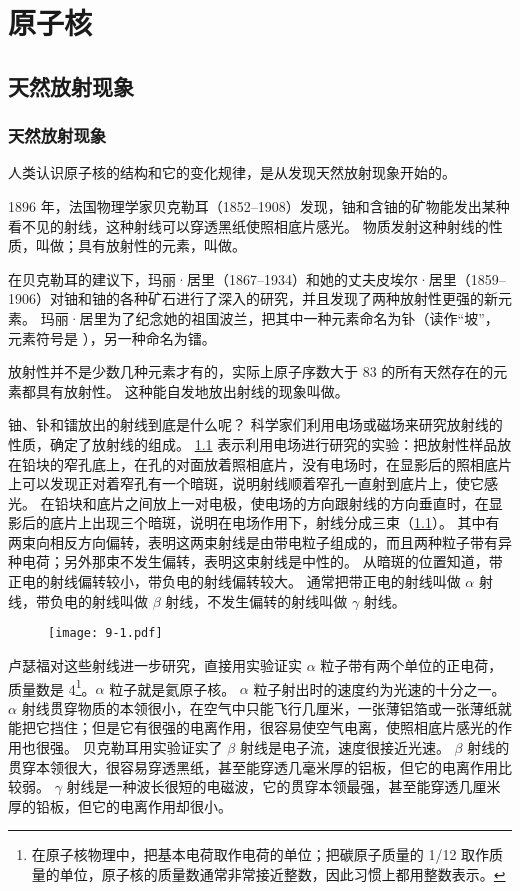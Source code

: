 \chapter{原子核}\label{chp:atomic_nucleus}
\section{天然放射现象}
\subsection{天然放射现象}
人类认识原子核的结构和它的变化规律，是从发现天然放射现象开始的。

1896 年，法国物理学家贝克勒耳（1852--1908）发现，铀和含铀的矿物能发出某种看不见的射线，这种射线可以穿透黑纸使照相底片感光。
物质发射这种射线的性质，叫做；具有放射性的元素，叫做。

在贝克勒耳的建议下，玛丽·居里（1867--1934）和她的丈夫皮埃尔·居里（1859--1906）对铀和铀的各种矿石进行了深入的研究，并且发现了两种放射性更强的新元素。
玛丽·居里为了纪念她的祖国波兰，把其中一种元素命名为钋（读作“坡”，元素符号是 ），另一种命名为镭。

放射性并不是少数几种元素才有的，实际上原子序数大于 83 的所有天然存在的元素都具有放射性。
这种能自发地放出射线的现象叫做。

铀、钋和镭放出的射线到底是什么呢？
科学家们利用电场或磁场来研究放射线的性质，确定了放射线的组成。
\cref{fig:9-1} 表示利用电场进行研究的实验：把放射性样品放在铅块的窄孔底上，在孔的对面放着照相底片，没有电场时，在显影后的照相底片上可以发现正对着窄孔有一个暗斑，说明射线顺着窄孔一直射到底片上，使它感光。
在铅块和底片之间放上一对电极，使电场的方向跟射线的方向垂直时，在显影后的底片上出现三个暗斑，说明在电场作用下，射线分成三束（\cref{fig:9-1}）。
其中有两束向相反方向偏转，表明这两束射线是由带电粒子组成的，而且两种粒子带有异种电荷；另外那束不发生偏转，表明这束射线是中性的。
从暗斑的位置知道，带正电的射线偏转较小，带负电的射线偏转较大。
通常把带正电的射线叫做 $\alpha$ 射线，带负电的射线叫做 $\beta$ 射线，不发生偏转的射线叫做 $\gamma$ 射线。

\begin{figure}
  \texttt{[image: 9-1.pdf]}
  \caption{}\label{fig:9-1}
\end{figure}

卢瑟福对这些射线进一步研究，直接用实验证实 $\alpha$ 粒子带有两个单位的正电荷，质量数是 4\footnote{在原子核物理中，把基本电荷取作电荷的单位；把碳原子质量的 1/12 取作质量的单位，原子核的质量数通常非常接近整数，因此习惯上都用整数表示。}。$\alpha$ 粒子就是氦原子核。
$\alpha$ 粒子射出时的速度约为光速的十分之一。
$\alpha$ 射线贯穿物质的本领很小，在空气中只能飞行几厘米，一张薄铝箔或一张薄纸就能把它挡住；但是它有很强的电离作用，很容易使空气电离，使照相底片感光的作用也很强。
贝克勒耳用实验证实了 $\beta$ 射线是电子流，速度很接近光速。
$\beta$ 射线的贯穿本领很大，很容易穿透黑纸，甚至能穿透几毫米厚的铝板，但它的电离作用比较弱。
$\gamma$ 射线是一种波长很短的电磁波，它的贯穿本领最强，甚至能穿透几厘米厚的铅板，但它的电离作用却很小。

